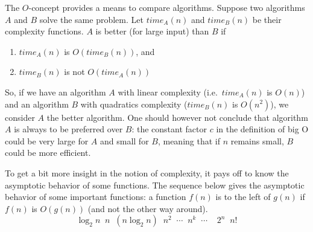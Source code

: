 The $O$-concept provides a means to compare algorithms. Suppose two
algorithms $A$ and $B$ solve the same problem. Let $time_A(n)$ and
$time_B(n)$ be their complexity functions. $A$ is better (for large
input) than $B$ if

\begin{enumerate}
\item $time_A(n)$ is $O(time_B(n))$, and
\item $time_B(n)$ is not $O(time_A(n))$
\end{enumerate}

So, if we have an algorithm $A$ with linear complexity
(i.e.\ $time_A(n)$ is $O(n)$) and an algorithm $B$ with quadratics
complexity ($time_B(n)$ is $O(n^2)$), we consider $A$ the
better algorithm.  One should however not conclude that algorithm $A$
is always to be preferred over $B$: the constant factor $c$ in the
definition of big O could be very large for $A$ and small for $B$,
meaning that if $n$ remains small, $B$ could be more efficient.

To get a bit more insight in the notion of complexity, it pays off to
know the asymptotic behavior of some functions. The sequence below
gives the asymptotic behavior of some important functions: a function
$f(n)$ is to the left of $g(n)$ if $f(n)$ is $O(g(n))$ (and not the
other way around).
\[ \log_2 n \;\; n\;\; (n\log_2 n)\;\;  n^2\;\; \cdots\;\; n^k\;\;
\cdots\;\; \;\;2^n \;\; n!  \]

